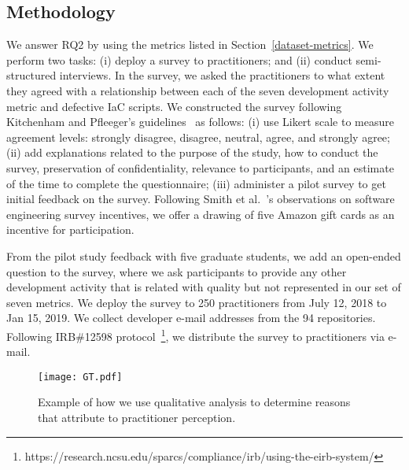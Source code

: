 \documentclass[smallextended]{svjour3}       %
\begin{document}
\subsection{Methodology}
\label{meth-rq2}

We answer RQ2 by using the metrics listed in Section~\ref{dataset-metrics}. We perform two tasks: (i) deploy a survey to practitioners; and (ii) conduct semi-structured interviews. In the survey, we asked the practitioners to what extent they agreed with a relationship between each of the seven development activity metric and defective IaC scripts. We constructed the survey following Kitchenham and Pfleeger's guidelines~\citep{kitchenham2008:survey} as follows: (i) use Likert scale to measure agreement levels: strongly disagree, disagree, neutral, agree, and strongly agree; (ii) add explanations related to the purpose of the study, how to conduct the survey, preservation of confidentiality, relevance to participants, and an estimate of the time to complete the questionnaire; (iii) administer a pilot survey to get initial feedback on the survey. Following Smith et al.~\citep{smith:chase2013:survey}'s  observations on software engineering survey incentives, we offer a drawing of five Amazon gift cards as an incentive for participation.

From the pilot study feedback with five graduate students, we add an open-ended question to the survey, where we ask participants to provide any other development activity that is related with quality but not represented in our set of seven metrics. We deploy the survey to 250 practitioners from July 12, 2018 to Jan 15, 2019. We collect developer e-mail addresses from the 94 repositories. Following IRB\#12598 protocol~\footnote{https://research.ncsu.edu/sparcs/compliance/irb/using-the-eirb-system/}, we distribute the survey to practitioners via e-mail. 


\begin{figure*}
\centering 
\texttt{[image: GT.pdf]}
\caption{Example of how we use qualitative analysis to determine reasons that attribute to practitioner perception.}
\label{fig-meth-rq2-gt}
\end{figure*}


\end{document}
